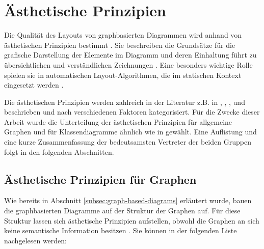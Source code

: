 \section{Ästhetische Prinzipien}
\label{sec:aesthetics-criteria}

Die Qualität des Layouts von graphbasierten Diagrammen wird anhand von ästhetischen Prinzipien bestimmt \cite{Maier12A-Pattern-based}. Sie beschreiben die Grundsätze für die grafische Darstellung der Elemente im Diagramm und deren Einhaltung führt zu übersichtlichen und verständlichen Zeichnungen \cite{Siebenhaller03Automatisches}. Eine besonders wichtige Rolle spielen sie in automatischen Layout-Algorithmen, die im statischen Kontext eingesetzt werden \cite{Maier12A-Pattern-based}.

Die ästhetischen Prinzipien werden zahlreich in der Literatur z.B. in \cite{Siebenhaller03Automatisches}, \cite{EichelbergerSchmid09Guidelines}, \cite{Ambler05The-Elements}, \cite{Eichelberger05Aesthetics} und \cite{ShieberKosak93Automating} beschrieben und nach verschiedenen Faktoren kategorisiert. Für die Zwecke dieser Arbeit wurde die Unterteilung der ästhetischen Prinzipien für allgemeine Graphen und für Klassendiagramme ähnlich wie in \cite{Siebenhaller03Automatisches} gewählt. Eine Auflistung und eine kurze Zusammenfassung der bedeutsamsten Vertreter der beiden Gruppen folgt in den folgenden Abschnitten.

\subsection{Ästhetische Prinzipien für Graphen}
\label{subsec:aesthetics-criteria-graphs}

Wie bereits in Abschnitt \ref{subsec:graph-based-diagrams} erläutert wurde, bauen die graphbasierten Diagramme auf der Struktur der Graphen auf. Für diese Struktur lassen sich ästhetische Prinzipien aufstellen, obwohl die Graphen an sich keine semantische Information besitzen \cite{Siebenhaller03Automatisches}. Sie können in der folgenden Liste nachgelesen werden:

